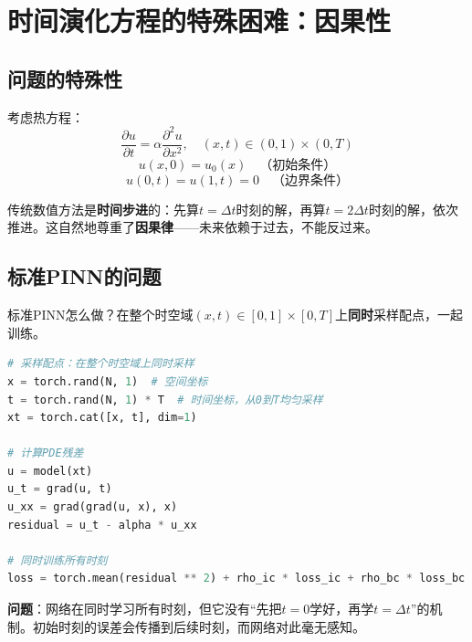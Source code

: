 \section{时间演化方程的特殊困难：因果性}

\subsection{问题的特殊性}

考虑热方程：
\begin{equation}
    \frac{\partial u}{\partial t} = \alpha \frac{\partial^2 u}{\partial x^2}, \quad (x, t) \in (0, 1) \times (0, T)
\end{equation}
\begin{equation}
    u(x, 0) = u_0(x) \quad \text{（初始条件）}
\end{equation}
\begin{equation}
    u(0, t) = u(1, t) = 0 \quad \text{（边界条件）}
\end{equation}

传统数值方法是\textbf{时间步进}的：先算$t = \Delta t$时刻的解，再算$t = 2\Delta t$时刻的解，依次推进。这自然地尊重了\textbf{因果律}——未来依赖于过去，不能反过来。

\subsection{标准PINN的问题}

标准PINN怎么做？在整个时空域$(x, t) \in [0, 1] \times [0, T]$上\textbf{同时}采样配点，一起训练。

\begin{lstlisting}[language=Python, caption={标准PINN处理热方程（有问题的版本）}]
# 采样配点：在整个时空域上同时采样
x = torch.rand(N, 1)  # 空间坐标
t = torch.rand(N, 1) * T  # 时间坐标，从0到T均匀采样
xt = torch.cat([x, t], dim=1)

# 计算PDE残差
u = model(xt)
u_t = grad(u, t)
u_xx = grad(grad(u, x), x)
residual = u_t - alpha * u_xx

# 同时训练所有时刻
loss = torch.mean(residual ** 2) + rho_ic * loss_ic + rho_bc * loss_bc
\end{lstlisting}

\textbf{问题}：网络在同时学习所有时刻，但它没有“先把$t=0$学好，再学$t=\Delta t$”的机制。初始时刻的误差会传播到后续时刻，而网络对此毫无感知。

